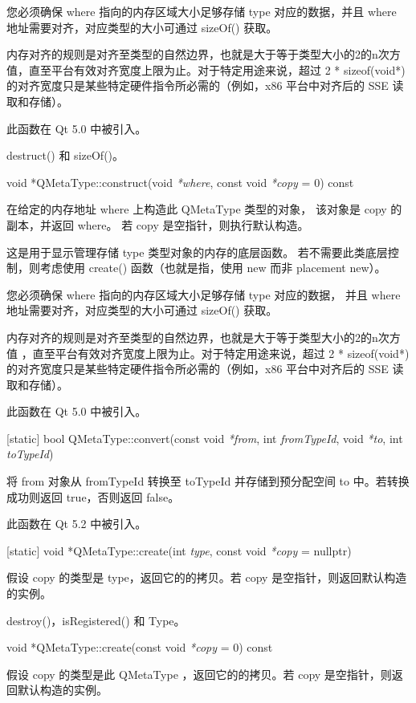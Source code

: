 您必须确保 where 指向的内存区域大小足够存储 type 对应的数据，并且 where 地址需要对齐，对应类型的大小可通过 sizeOf() 获取。

内存对齐的规则是对齐至类型的自然边界，也就是大于等于类型大小的2的n次方值，直至平台有效对齐宽度上限为止。对于特定用途来说，超过 2 * sizeof(void*) 的对齐宽度只是某些特定硬件指令所必需的（例如，x86 平台中对齐后的 SSE 读取和存储）。

此函数在 Qt 5.0 中被引入。

\begin{seeAlso}
destruct() 和 sizeOf()。
\end{seeAlso}

void *QMetaType::construct(void \emph{*where}, const void \emph{*copy} = 0) const

在给定的内存地址 where 上构造此 QMetaType 类型的对象，
该对象是 copy 的副本，并返回 where。
若 copy 是空指针，则执行默认构造。

这是用于显示管理存储 type 类型对象的内存的底层函数。
若不需要此类底层控制，则考虑使用 create() 函数（也就是指，使用 new 而非 placement new）。

您必须确保 where 指向的内存区域大小足够存储 type 对应的数据，
并且 where 地址需要对齐，对应类型的大小可通过 sizeOf() 获取。

内存对齐的规则是对齐至类型的自然边界，也就是大于等于类型大小的2的n次方值
，直至平台有效对齐宽度上限为止。对于特定用途来说，超过 2 * sizeof(void*) 的对齐宽度只是某些特定硬件指令所必需的（例如，x86 平台中对齐后的 SSE 读取和存储）。

此函数在 Qt 5.0 中被引入。

[static] bool QMetaType::convert(const void \emph{*from}, int \emph{fromTypeId}, void \emph{*to}, int \emph{toTypeId})

将 from 对象从 fromTypeId 转换至 toTypeId 并存储到预分配空间 to 中。若转换成功则返回 true，否则返回 false。

此函数在 Qt 5.2 中被引入。

[static] void *QMetaType::create(int \emph{type}, const void \emph{*copy} = nullptr)

假设 copy 的类型是 type，返回它的的拷贝。若 copy 是空指针，则返回默认构造的实例。

\begin{seeAlso}
destroy()，isRegistered() 和 Type。
\end{seeAlso}

void *QMetaType::create(const void \emph{*copy} = 0) const

假设 copy 的类型是此 QMetaType ，返回它的的拷贝。若 copy 是空指针，则返回默认构造的实例。

